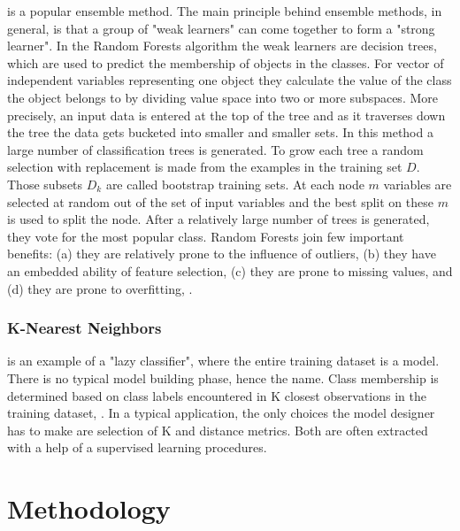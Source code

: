 \documentclass{llncs}
\begin{document}
is a popular ensemble method. The main principle behind ensemble methods, in general, is that a group of "weak learners" can come together to form a "strong learner". In the Random Forests algorithm the weak learners are decision trees, which are used to predict the membership of objects in the classes. For vector of independent variables representing one object they calculate the value of the class the object belongs to by dividing value space into two or more subspaces. More precisely, an input data is entered at the top of the tree and as it traverses down the tree the data gets bucketed into smaller and smaller sets. In this method a large number of classification trees is generated. To grow each tree a random selection with replacement is made from the examples in the training set $D$. Those subsets $D_{k}$ are called bootstrap training sets. At each node $m$ variables are selected at random out of the set of input variables and the best split on these $m$ is used to split the node. After a relatively large number of trees is generated, they vote for the most popular class. Random Forests join few important benefits: (a) they are relatively prone to the influence of outliers, (b) they have an embedded ability of feature selection, (c) they are prone to missing values, and (d) they are prone to overfitting, \cite{Breiman2001}. 

\vspace{-9pt}
\subsubsection{K-Nearest Neighbors}

is an example of a "lazy classifier", where the entire training dataset is a model. There is no typical model building phase, hence the name. Class membership is determined based on class labels encountered in K closest observations in the training dataset, \cite{Altman1992}. In a typical application, the only choices the model designer has to make are selection of K and distance metrics. Both are often extracted with a help of a supervised learning procedures.

\section{Methodology}
  \label{sec:Methodology}
  
\end{document}
